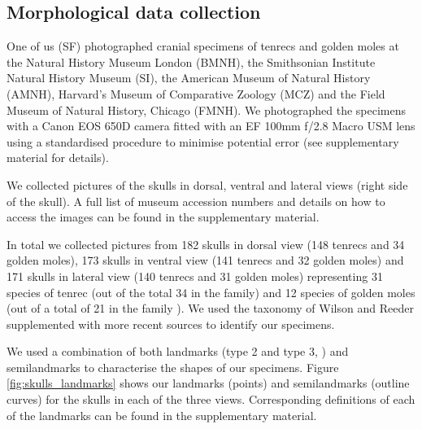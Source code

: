 \documentclass[12pt,a4paper]{article}
\begin{document}
	

\subsection{Morphological data collection} 
	
	One of us (SF) photographed cranial specimens of tenrecs and golden moles at the Natural History Museum London (BMNH), the Smithsonian Institute Natural History Museum (SI), the American Museum of Natural History (AMNH), Harvard's Museum of Comparative Zoology (MCZ) and the Field Museum of Natural History, Chicago (FMNH). We photographed the specimens with a Canon EOS 650D camera fitted with an EF 100mm f/2.8 Macro USM lens using a standardised procedure to minimise potential error (see supplementary material for details). 

	We collected pictures of the skulls in dorsal, ventral and lateral views (right side of the skull). A full list of museum accession numbers and details on how to access the images can be found in the supplementary material.
	

	In total we collected pictures from 182 skulls in dorsal view (148 tenrecs and 34 golden moles), 173 skulls in ventral view (141 tenrecs and 32 golden moles) and 171 skulls in lateral view (140 tenrecs and 31 golden moles) representing 31 species of tenrec (out of the total 34 in the family) and 12 species of golden moles (out of a total of 21 in the family \citep{Asher2010}). We used the taxonomy of Wilson and Reeder \citeyearpar{Wilson2005} supplemented with more recent sources \citep{Olson2013} to identify our specimens. 
	

	We used a combination of both landmarks (type 2 and type 3, \citep{Zelditch2012}) and semilandmarks to characterise the shapes of our specimens. Figure \ref{fig:skulls_landmarks} shows our landmarks (points) and semilandmarks (outline curves) for the skulls in each of the three views. Corresponding definitions of each of the landmarks can be found in the supplementary material.
	
\end{document}

